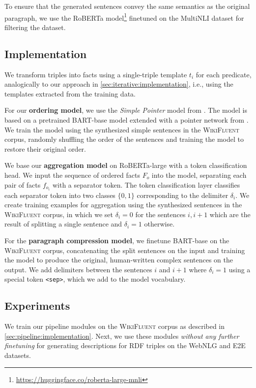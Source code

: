 \documentclass[12pt,notitlepage,a4paper,oneside,openany]{report}
\renewcommand\cite{\citep}
\begin{document}
To ensure that the generated sentences convey the same semantics as the original paragraph, we use the RoBERTa model\footnote{\url{https://huggingface.co/roberta-large-mnli}} \cite{liuRoBERTaRobustlyOptimized2019} finetuned on the MultiNLI dataset \cite{williams2018mnli} for filtering the dataset.

\subsection{Implementation}
\label{sec:pipeline:implementation}

We transform triples into facts using a single-triple template $t_i$ for each predicate, analogically to our approach in \autoref{sec:iterative:implementation}, i.e., using the templates extracted from the training data.

For our \textbf{ordering model}, we use the \emph{Simple Pointer} model from \citet{calizzano2021ordering}. The model is based on a pretrained BART-base model \cite{lewisBARTDenoisingSequencetoSequence2019} extended with a pointer network from \citet{wang2019hierarchical}. We train the model using the synthesized simple sentences in the \textsc{WikiFluent} corpus, randomly shuffling the order of the sentences and training the model to restore their original order.

We base our \textbf{aggregation model} on RoBERTa-large \cite{liuRoBERTaRobustlyOptimized2019} with a token classification head. We input the sequence of ordered facts $F_o$ into the model, separating each pair of facts $f_{o_i}$ with a separator token. The token classification layer classifies each separator token into two classes $\{0,1\}$ corresponding to the delimiter $\delta_i$. We create training examples for aggregation using the synthesized sentences in the \textsc{WikiFluent} corpus, in which we set $\delta_i=0$ for the sentences $i,i+1$ which are the result of splitting a single sentence and $\delta_i=1$ otherwise.

For the \textbf{paragraph compression model}, we finetune BART-base \cite{lewisBARTDenoisingSequencetoSequence2019} on the \textsc{WikiFluent} corpus, concatenating the split sentences on the input and training the model to produce the original, human-written complex sentences on the output. We add delimiters between the sentences $i$ and $i+1$ where $\delta_i=1$ using a special token \texttt{<sep>}, which we add to the model vocabulary.


\subsection{Experiments}
\label{sec:pipeline:experiments}
We train our pipeline modules on the \textsc{WikiFluent} corpus as described in \autoref{sec:pipeline:implementation}. Next, we use these modules \textit{without any further finetuning} for generating descriptions for RDF triples on the WebNLG and E2E datasets.
\end{document}
